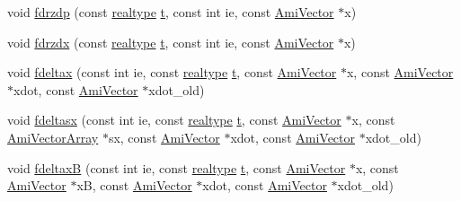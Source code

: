 \begin{DoxyCompactItemize}
\item 
void \mbox{\hyperlink{classamici_1_1_model_ae7dc86ad0c432396fa21ad0f423c531c}{fdrzdp}} (const \mbox{\hyperlink{namespaceamici_a1bdce28051d6a53868f7ccbf5f2c14a3}{realtype}} \mbox{\hyperlink{classamici_1_1_model_a711281d57e9710226face29151cc4641}{t}}, const int ie, const \mbox{\hyperlink{classamici_1_1_ami_vector}{Ami\+Vector}} $\ast$x)
\item 
void \mbox{\hyperlink{classamici_1_1_model_a2e4c45f13fbdf23c764b353ef336f7a3}{fdrzdx}} (const \mbox{\hyperlink{namespaceamici_a1bdce28051d6a53868f7ccbf5f2c14a3}{realtype}} \mbox{\hyperlink{classamici_1_1_model_a711281d57e9710226face29151cc4641}{t}}, const int ie, const \mbox{\hyperlink{classamici_1_1_ami_vector}{Ami\+Vector}} $\ast$x)
\item 
void \mbox{\hyperlink{classamici_1_1_model_a8e0cb4f4dd677822d0c33117e267f661}{fdeltax}} (const int ie, const \mbox{\hyperlink{namespaceamici_a1bdce28051d6a53868f7ccbf5f2c14a3}{realtype}} \mbox{\hyperlink{classamici_1_1_model_a711281d57e9710226face29151cc4641}{t}}, const \mbox{\hyperlink{classamici_1_1_ami_vector}{Ami\+Vector}} $\ast$x, const \mbox{\hyperlink{classamici_1_1_ami_vector}{Ami\+Vector}} $\ast$xdot, const \mbox{\hyperlink{classamici_1_1_ami_vector}{Ami\+Vector}} $\ast$xdot\+\_\+old)
\item 
void \mbox{\hyperlink{classamici_1_1_model_a685b7374d29d96f7d40d83c7d92fcf27}{fdeltasx}} (const int ie, const \mbox{\hyperlink{namespaceamici_a1bdce28051d6a53868f7ccbf5f2c14a3}{realtype}} \mbox{\hyperlink{classamici_1_1_model_a711281d57e9710226face29151cc4641}{t}}, const \mbox{\hyperlink{classamici_1_1_ami_vector}{Ami\+Vector}} $\ast$x, const \mbox{\hyperlink{classamici_1_1_ami_vector_array}{Ami\+Vector\+Array}} $\ast$sx, const \mbox{\hyperlink{classamici_1_1_ami_vector}{Ami\+Vector}} $\ast$xdot, const \mbox{\hyperlink{classamici_1_1_ami_vector}{Ami\+Vector}} $\ast$xdot\+\_\+old)
\item 
void \mbox{\hyperlink{classamici_1_1_model_a5542077fa03103e502349d92dc95f33a}{fdeltaxB}} (const int ie, const \mbox{\hyperlink{namespaceamici_a1bdce28051d6a53868f7ccbf5f2c14a3}{realtype}} \mbox{\hyperlink{classamici_1_1_model_a711281d57e9710226face29151cc4641}{t}}, const \mbox{\hyperlink{classamici_1_1_ami_vector}{Ami\+Vector}} $\ast$x, const \mbox{\hyperlink{classamici_1_1_ami_vector}{Ami\+Vector}} $\ast$xB, const \mbox{\hyperlink{classamici_1_1_ami_vector}{Ami\+Vector}} $\ast$xdot, const \mbox{\hyperlink{classamici_1_1_ami_vector}{Ami\+Vector}} $\ast$xdot\+\_\+old)
\item 

\end{DoxyCompactItemize}

